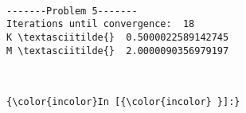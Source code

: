 \documentclass[11pt]{article}
\begin{document}
    \begin{center}
    \end{center}
    { \hspace*{\fill} \\}
    
    \begin{Verbatim}[commandchars=\\\{\}]
-------Problem 5-------
Iterations until convergence:  18
K \textasciitilde{}  0.5000022589142745
M \textasciitilde{}  2.0000090356979197

    \end{Verbatim}

    \begin{center}
    \end{center}
    { \hspace*{\fill} \\}
    
    \begin{Verbatim}[commandchars=\\\{\}]
{\color{incolor}In [{\color{incolor} }]:} 
\end{Verbatim}


    
    
    
    
\end{document}
